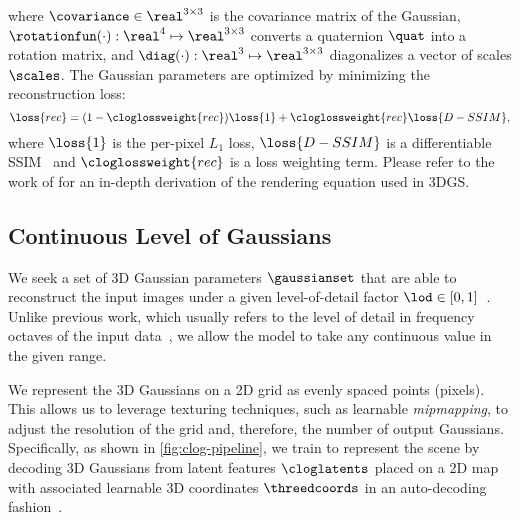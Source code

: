     where $\covariance \in \real^{3{\times}3}$ is the covariance matrix of the Gaussian,
    $\rotationfun(\cdot): \real^4 \mapsto \real^{3{\times}3}$ converts a quaternion $\quat$ into a rotation matrix, and $\diag(\cdot): \real^3\mapsto\real^{3{\times}3}$ diagonalizes a vector of scales $\scales$.
    The Gaussian parameters are optimized by minimizing the reconstruction loss:
    \begin{equation}
      \loss{rec} = (1 - \cloglossweight{rec}) \loss{1} + \cloglossweight{rec} \loss{D-SSIM},
      \label{eq:clog-reconloss}
    \end{equation}
    where $\loss{1}$ is the per-pixel $L_1$ loss, $\loss{D-SSIM}$ is a differentiable SSIM~\cite{kerbl20233d}
    and $\cloglossweight{rec}$ is a loss weighting term.
    Please refer to the work of \citet{kerbl20233d} for an in-depth derivation
    of the rendering equation used in 3DGS.

  \subsection{Continuous Level of Gaussians}
    \label{sec:clog-pipeline}

    We seek a set of 3D Gaussian parameters $\gaussianset$ that are able to
    reconstruct the input images under a given level-of-detail factor $\lod
    \in [0,1]$~\cite{takikawa2021neural}.
    Unlike previous work, which usually refers to the level of detail in
    frequency octaves of the input data~\cite{seo2024flod,ren2024octree}, we
    allow the model to take any continuous value in the given range.

    We represent the 3D Gaussians on a 2D grid as evenly spaced points
    (pixels).
    This allows us to leverage texturing techniques, such as learnable
    \textit{mipmapping}, to adjust the resolution of the grid and, therefore,
    the number of output Gaussians.
    Specifically, as shown in \cref{fig:clog-pipeline}, we train \clog to
    represent the scene by decoding 3D Gaussians from latent features
    $\cloglatents$ placed on a 2D map with associated learnable 3D coordinates
    $\threedcoords$ in an auto-decoding
    fashion~\cite{bojanowski2017otpimizing}.

